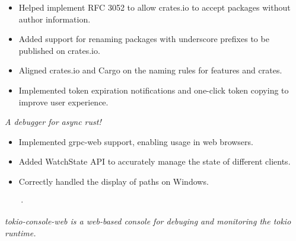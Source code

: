 \documentclass{software_engineer_rustin_liu}
\newcommand{\en}[1]{#1}
\newcommand{\zh}[1]{}
\begin{document}
\begin{itemize}
      \item \en{Helped implement RFC 3052 to allow crates.io to accept packages without author information.}
            \zh{帮助实现 RFC 3052，让 crates.io 开始接受无作者信息的包。}
      \item \en{Added support for renaming packages with underscore prefixes to be published on crates.io.}
            \zh{支持下划线前缀的重命名包在 crates.io 的发布。}
      \item \en{Aligned crates.io and Cargo on the naming rules for features and crates.}
            \zh{对齐了 crates.io 和 Cargo 对 feature 和 crate 的名称校验规则。}
      \item \en{Implemented token expiration notifications and one-click token copying to improve user experience.}
            \zh{实现了 token 过期提醒和一键复制功能以提升用户体验。}
\end{itemize}

\en{}
\zh{\datedsubsection{\textbf{consle(Rust) - 维护者}}{{\href{https://github.com/Rustin170506/tokio-console-web}{283+ commits}}}}
\en{\textsl{A debugger for async rust!}}
\zh{\textsl{一个用于调试异步 Rust 的工具！}}

\begin{itemize}
      \item \en{Implemented grpc-web support, enabling usage in web browsers.}
            \zh{实现了 grpc-web 支持，使其可以在浏览器中使用。}
      \item \en{Added WatchState API to accurately manage the state of different clients.}
            \zh{添加 WatchState API 以准确管理不同客户端的状态。}
      \item \en{Correctly handled the display of paths on Windows.}
            \zh{正确处理了 Windows 上路径的显示。}
·\end{itemize}

\en{}
\zh{\datedsubsection{\textbf{tokio-console-web(TypeScript/Rust) - 作者}}{{\href{https://github.com/Rustin170506/tokio-console-web}{283+ commits}}}}
\en{\textsl{tokio-console-web is a web-based console for debuging and monitoring the tokio runtime.}}
\zh{\textsl{tokio-console-web 是一个基于 web 的控制台，用于调试和监控 tokio runtime。}}
\end{document}
